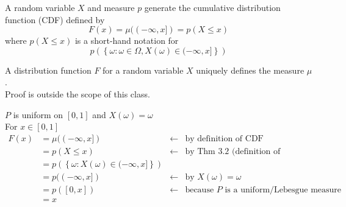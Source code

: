 \begin{definition}
    A random variable $X$ and measure $p$ generate the cumulative distribution function (CDF) defined by
    \[F(x) = \mu((-\infty, x]) = p(X \leq x)\]
    where $p(X\leq x)$ is a short-hand notation for
    \[p(\left\{\omega: \omega \in \Omega, X(\omega) \in (-\infty, x]\right\})\]
\end{definition}

\begin{theorem}[][3.3.1]
    A distribution function $F$ for a random variable $X$ uniquely defines the measure $\mu$.
    \\Proof is outside the scope of this class.
\end{theorem}

\begin{example}
    $P$ is uniform on $[0,1]$ and $X(\omega)=\omega$
    \\For $x\in[0,1]$
    \begin{align*}
        F(x) &= \mu((-\infty, x]) & \leftarrow& \text{by definition of CDF} \\
        &= p(X \leq x) & \leftarrow& \text{by Thm 3.2 (definition of distribution)} \\
        &= p\left(\left\{\omega :X(\omega) \in (-\infty, x]\right\}\right) \\
        &= p((-\infty, x]) & \leftarrow& \text{by }X(\omega) = \omega \\
        &= p([0,x]) & \leftarrow& \text{because $P$ is a uniform/Lebesgue measure} \\
        &= x
    \end{align*}
\end{example}

